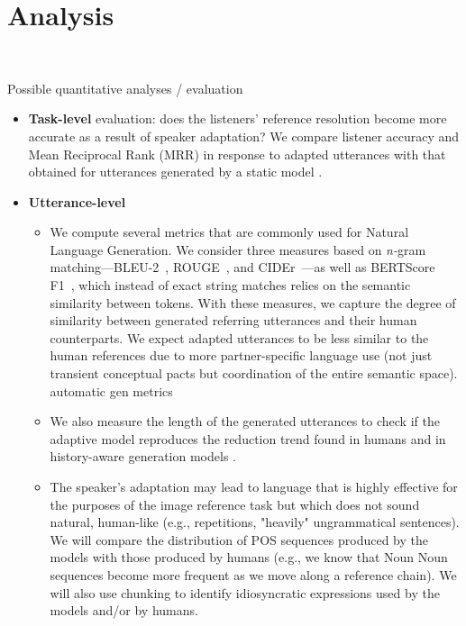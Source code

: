 
\section{Analysis}
\label{sec:analysis}

\\


Possible quantitative analyses / evaluation
\begin{itemize}
\item \textbf{Task-level }evaluation: does the listeners' reference resolution become more accurate as a result of speaker adaptation? We compare listener accuracy and Mean Reciprocal Rank (MRR) in response to adapted utterances with that obtained for utterances generated by a static model \cite{takmaz-etal-2020-refer}.
\item \textbf{Utterance-level}
	\begin{itemize}
	\item We compute several metrics that are commonly used for Natural Language Generation. We consider three measures based on \emph{n-}gram matching---BLEU-2~\cite{Papineni:2002},
ROUGE~\cite{Lin2004}, and CIDEr~\cite{cider}---as well as BERTScore F1~\cite{bert-score}, which instead of exact string matches relies on the semantic similarity between tokens. With these measures, we capture the degree of similarity between generated referring utterances and their human counterparts. We expect adapted utterances to be less similar to the human references due to more partner-specific language use (not just transient conceptual pacts but coordination of the entire semantic space).
automatic gen metrics
	\item We also measure the length of the generated utterances to check if the adaptive model reproduces the reduction trend found in humans \cite{haber2019photobook,hawkins2020continual} and in history-aware generation models \cite{takmaz-etal-2020-refer,hawkins2020characterizing}.
	\item The speaker's adaptation may lead to language that is highly effective for the purposes of the image reference task but which does not sound natural, human-like (e.g., repetitions, "heavily" ungrammatical sentences). We will compare the distribution of POS sequences produced by the models with those produced by humans (e.g., we know that Noun Noun sequences become more frequent as we move along a reference chain). We will also use chunking to identify idiosyncratic expressions used by the models and/or by humans.

\end{itemize}
\end{itemize}
